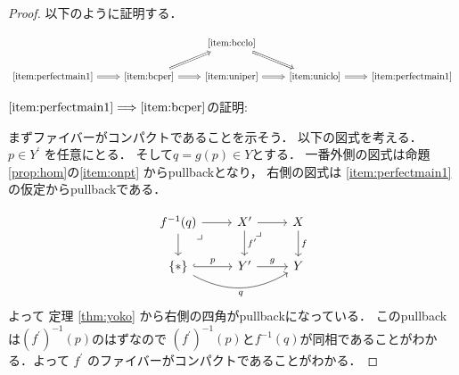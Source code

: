 \documentclass[leqno, a4paper, 12pt, dvipdfmx]{jsarticle}
\newcommand{\To}{\Longrightarrow}
\begin{document}
\begin{proof}

以下のように証明する．

\[
\begin{tikzcd}
& & \ref{item:bcclo}  \arrow[dr, Rightarrow]& &\\
\ref{item:perfectmain1} \arrow[r, Rightarrow] & \ref{item:bcper}  \arrow[ur, Rightarrow]\arrow[r, Rightarrow] & \ref{item:uniper}
\arrow[r, Rightarrow] & \ref{item:uniclo} \arrow[r, Rightarrow]& \ref{item:perfectmain1}
\end{tikzcd}
\]


$\ref{item:perfectmain1}\To \ref{item:bcper}$の証明:


まずファイバーがコンパクトであることを示そう．
以下の図式を考える．
$p\in Y^{\prime}$
を任意にとる．
そして$q=g(p)\in Y$とする．
一番外側の図式は命題\ref{prop:hom}の\ref{item:onpt}
からpullbackとなり，
右側の図式は
\ref{item:perfectmain1}の仮定からpullbackである．

\[
\begin{tikzcd}
f^{-1}(q) \arrow[dr, phantom, "\lrcorner", very near start] \arrow[r] \arrow[d] & X^{\prime} \arrow[r] \arrow[d, "f^{\prime}"] \arrow[dr, phantom, "\lrcorner", very near start]
 & X \arrow[d, "f"]\\
\{*\} \arrow[r, hook, "p" ]
\arrow[rr, bend right, "q"' ]
& Y^{\prime} \arrow[r, "g"] & Y
\end{tikzcd}
\]
よって
定理
\ref{thm:yoko}
から右側の四角がpullbackになっている．
このpullbackは$(f^{\prime})^{-1}(p)$のはずなので
$(f^{\prime})^{-1}(p)$と$f^{-1}(q)$が同相であることがわかる．よって
$f^{\prime}$
のファイバーがコンパクトであることがわかる．



\end{proof}
\end{document}
